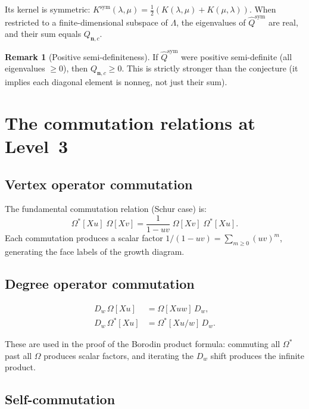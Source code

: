 \documentclass[11pt]{article}
\newcommand{\La}{\Lambda}
\theoremstyle{plain}
\theoremstyle{definition}
\newtheorem{remark}[theorem]{Remark}
\begin{document}
Its kernel is symmetric:
$K^{\mathrm{sym}}(\lambda, \mu)
= \tfrac{1}{2}(K(\lambda,\mu) + K(\mu,\lambda))$.
When restricted to a finite-dimensional subspace of $\La$, the
eigenvalues of $\hat{Q}^{\mathrm{sym}}$ are real, and their sum
equals $Q_{\mathbf{n},c}$.

\begin{remark}[Positive semi-definiteness]
If $\hat{Q}^{\mathrm{sym}}$ were positive semi-definite (all
eigenvalues $\geq 0$), then $Q_{\mathbf{n},c} \geq 0$.  This is
strictly stronger than the conjecture (it implies each diagonal
element is nonneg, not just their sum).
\end{remark}


\section{The commutation relations at Level~3}
\label{sec:commutation-L3}

\subsection{Vertex operator commutation}

The fundamental commutation relation (Schur case) is:
\begin{equation}\label{eq:comm}
  \Omega^*[Xu]\;\Omega[Xv]
  = \frac{1}{1 - uv}\;\Omega[Xv]\;\Omega^*[Xu].
\end{equation}
Each commutation produces a scalar factor $1/(1-uv)
= \sum_{m \geq 0}(uv)^m$, generating the face labels of the
growth diagram.

\subsection{Degree operator commutation}

\begin{align}
  D_w\, \Omega[Xu] &= \Omega[Xuw]\, D_w,
    \label{eq:Dw-comm-up} \\
  D_w\, \Omega^*[Xu] &= \Omega^*[Xu/w]\, D_w.
    \label{eq:Dw-comm-down}
\end{align}

These are used in the proof of the Borodin product formula:
commuting all $\Omega^*$ past all $\Omega$ produces scalar
factors, and iterating the $D_w$ shift produces the infinite
product.

\subsection{Self-commutation}
\end{document}
